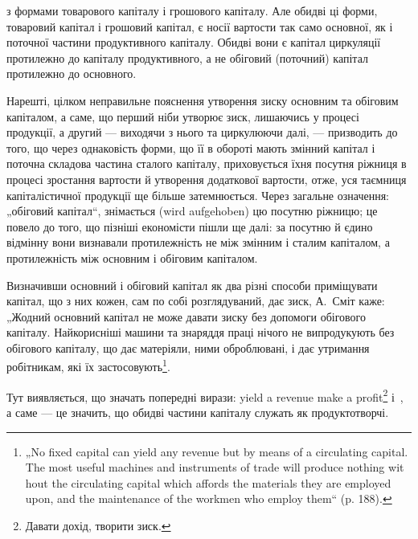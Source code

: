 \parcont{}  %
з формами товарового капіталу і грошового капіталу. Але обидві ці форми,
товаровий капітал і грошовий капітал, є носії вартости так само
основної, як і поточної частини продуктивного капіталу. Обидві вони є
капітал циркуляції протилежно до капіталу продуктивного, а не обіговий
(поточний) капітал протилежно до основного.

Нарешті, цілком неправильне пояснення утворення зиску основним
та обіговим капіталом, а саме, що перший ніби утворює зиск, лишаючись
у процесі продукції, а другий — виходячи з нього та циркулюючи далі, —
призводить до того, що через однаковість форми, що її в обороті
мають змінний капітал і поточна складова частина сталого капіталу, приховується
їхня посутня ріжниця в процесі зростання вартости й
утворення додаткової вартости, отже, уся таємниця капіталістичної продукції
ще більше затемнюється. Через загальне означення: „обіговий капітал“,
знімається (wird aufgehoben) цю посутню ріжницю; це повело до
того, що пізніші економісти пішли ще далі: за посутню й єдино відмінну
вони визнавали протилежність не між змінним і сталим капіталом, а
протилежність між основним і обіговим капіталом.

Визначивши основний і обіговий капітал як два різні способи приміщувати
капітал, що з них кожен, сам по собі розглядуваний, дає зиск,
А.~Сміт каже: „Жодний основний капітал не може давати зиску без допомоги
обігового капіталу. Найкорисніші машини та знаряддя праці нічого
не випродукують без обігового капіталу, що дає матеріяли, ними
оброблювані, і дає утримання робітникам, які їх застосовують\footnote*{
„No fixed capital can yield any revenue but by means of a circulating capital.
The most useful machines and instruments of trade will produce nothing wit
hout the circulating capital which affords the materials they are employed upon, and
the maintenance of the workmen who employ them“ (p. 188).
}.

Тут виявляється, що значать попередні вирази: yield a revenue make
a profit\footnote*{
Давати дохід, творити зиск.
} і~, а саме — це значить, що обидві частини капіталу служать
як продуктотворчі.

